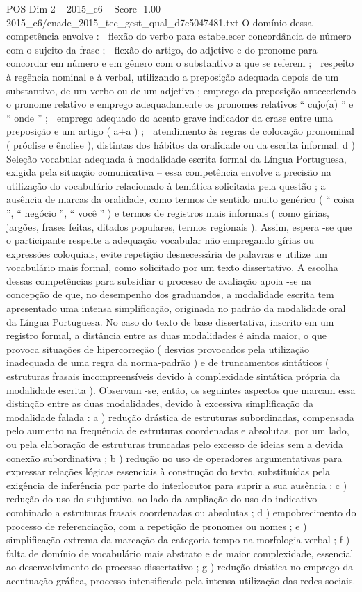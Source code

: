 \begin{textsample}{POS Dim 2 – 2015\_c6 – Score -1.00 – 2015\_c6/enade\_2015\_tec\_gest\_qual\_d7c5047481.txt}
O domínio dessa competência envolve :  flexão do verbo para estabelecer concordância de número com o sujeito da frase ;  flexão do artigo, do adjetivo e do pronome para concordar em número e em gênero com o substantivo a que se referem ;  respeito à regência nominal e à verbal, utilizando a preposição adequada depois de um substantivo, de um verbo ou de um adjetivo ; emprego da preposição antecedendo o pronome relativo e emprego adequadamente os pronomes relativos “ cujo(a) ” e “ onde ” ;  emprego adequado do acento grave indicador da crase entre uma preposição e um artigo ( a+a ) ;  atendimento às regras de colocação pronominal ( próclise e ênclise ), distintas dos hábitos da oralidade ou da escrita informal. d ) Seleção vocabular adequada à modalidade escrita formal da Língua Portuguesa, exigida pela situação comunicativa – essa competência envolve a precisão na utilização do vocabulário relacionado à temática solicitada pela questão ; a ausência de marcas da oralidade, como termos de sentido muito genérico ( “ coisa ”, “ negócio ”, “ você ” ) e termos de registros mais informais ( como gírias, jargões, frases feitas, ditados populares, termos regionais ).
Assim, espera -se que o participante respeite a adequação vocabular não empregando gírias ou expressões coloquiais, evite repetição desnecessária de palavras e utilize um vocabulário mais formal, como solicitado por um texto dissertativo.
A escolha dessas competências para subsidiar o processo de avaliação apoia -se na concepção de que, no desempenho dos graduandos, a modalidade escrita tem apresentado uma intensa simplificação, originada no padrão da modalidade oral da Língua Portuguesa.
No caso do texto de base dissertativa, inscrito em um registro formal, a distância entre as duas modalidades é ainda maior, o que provoca situações de hipercorreção ( desvios provocados pela utilização inadequada de uma regra da norma-padrão ) e de truncamentos sintáticos ( estruturas frasais incompreensíveis devido à complexidade sintática própria da modalidade escrita ).
Observam -se, então, os seguintes aspectos que marcam essa distinção entre as duas modalidades, devido à excessiva simplificação da modalidade falada : a ) redução drástica de estruturas subordinadas, compensada pelo aumento na frequência de estruturas coordenadas e absolutas, por um lado, ou pela elaboração de estruturas truncadas pelo excesso de ideias sem a devida conexão subordinativa ; b ) redução no uso de operadores argumentativas para expressar relações lógicas essenciais à construção do texto, substituídas pela exigência de inferência por parte do interlocutor para suprir a sua ausência ; c ) redução do uso do subjuntivo, ao lado da ampliação do uso do indicativo combinado a estruturas frasais coordenadas ou absolutas ; d ) empobrecimento do processo de referenciação, com a repetição de pronomes ou nomes ; e ) simplificação extrema da marcação da categoria tempo na morfologia verbal ; f ) falta de domínio de vocabulário mais abstrato e de maior complexidade, essencial ao desenvolvimento do processo dissertativo ; g ) redução drástica no emprego da acentuação gráfica, processo intensificado pela intensa utilização das redes sociais.

\end{textsample}
